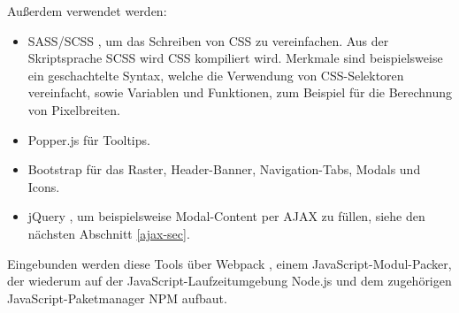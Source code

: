 Außerdem verwendet werden:

\begin{itemize}
\item SASS/SCSS \cite{sass}, um das Schreiben von CSS zu vereinfachen. Aus der Skriptsprache SCSS wird CSS kompiliert wird. Merkmale sind beispielsweise ein geschachtelte Syntax, welche die Verwendung von CSS-Selektoren vereinfacht, sowie Variablen und Funktionen, zum Beispiel für die Berechnung von Pixelbreiten. 
\item Popper.js \cite{popperjs} für Tooltips.
\item Bootstrap \cite{bootstrap} für das Raster, Header-Banner, Navigation-Tabs, Modals und Icons. 
\item jQuery \cite{jquery}, um beispielsweise Modal-Content per AJAX zu füllen, siehe den nächsten Abschnitt \ref{ajax-sec}.
\end{itemize}

Eingebunden werden diese Tools über Webpack \cite{webpack}, einem JavaScript-Modul-Packer, der wiederum auf der JavaScript-Laufzeitumgebung Node.js \cite{nodejs} und dem zugehörigen JavaScript-Paketmanager NPM \cite{npm} aufbaut. 

